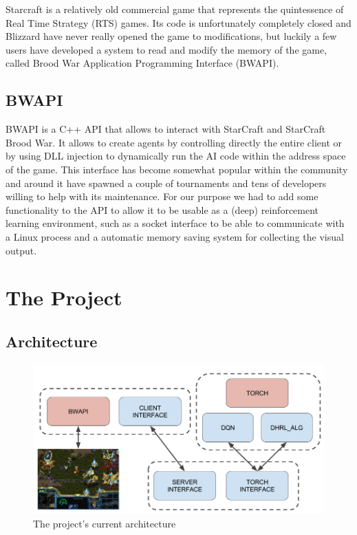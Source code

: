 \documentclass[bsc,frontabs,twoside,singlespacing,parskip,deptreport]{infthesis}     %
\begin{document}
Starcraft is a relatively old commercial game that represents the quintessence
of Real Time Strategy (RTS) games. Its code is unfortunately completely closed
and Blizzard have never really opened the game to modifications, but luckily a
few users have developed a system to read and modify the memory of the game,
called Brood War Application Programming Interface (BWAPI)\cite{bwapi2011brood}.

\section{BWAPI}

BWAPI is a C++ API that allows to interact with StarCraft and StarCraft Brood
War. It allows to create agents by controlling directly the entire client or by
using DLL injection to dynamically run the AI code within the address space of
the game. This interface has become somewhat popular within the community and
around it have spawned a couple of tournaments and tens of developers willing to
help with its maintenance. For our purpose we had to add some functionality to
the API to allow it to be usable as a (deep) reinforcement learning environment,
such as a socket interface to be able to communicate with a Linux process and a
automatic memory saving system for collecting the visual output.

\chapter{The Project}

\section{Architecture}

\begin{figure}[h]
    \centering
    \includegraphics[width=\textwidth]{architecture}
    \caption{The project's current architecture}
    \label{fig:arch}
\end{figure}
\end{document}
